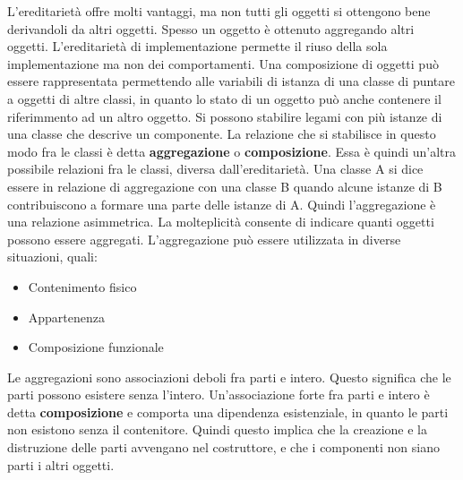 \documentclass[a4paper,18pt]{extarticle}
\begin{document}
L'ereditarietà offre molti vantaggi, ma non tutti gli oggetti si ottengono bene derivandoli da altri oggetti. Spesso un oggetto è ottenuto aggregando altri oggetti. L'ereditarietà di implementazione permette il riuso della sola implementazione ma non dei comportamenti. Una composizione di oggetti può essere rappresentata permettendo alle variabili di istanza di una classe di puntare a oggetti di altre classi, in quanto lo stato di un oggetto può anche contenere il riferimmento ad un altro oggetto. Si possono stabilire legami con più istanze di una classe che descrive un componente. La relazione che si stabilisce in questo modo fra le classi è detta \textbf{aggregazione} o \textbf{composizione}. Essa è quindi un'altra possibile relazioni fra le classi, diversa dall'ereditarietà. Una classe A si dice essere in relazione di aggregazione con una classe B quando alcune istanze di B contribuiscono a formare una parte delle istanze di A. Quindi l'aggregazione è una relazione asimmetrica. La molteplicità consente di indicare quanti oggetti possono essere aggregati. L'aggregazione può essere utilizzata in diverse situazioni, quali:
\begin{itemize}
\item Contenimento fisico
\item Appartenenza
\item Composizione funzionale
\end{itemize}

Le aggregazioni sono associazioni deboli fra parti e intero. Questo significa che le parti possono esistere senza l'intero. Un'associazione forte fra parti e intero è detta \textbf{composizione} e comporta una dipendenza esistenziale, in quanto le parti non esistono senza il contenitore. Quindi questo implica che la creazione e la distruzione delle parti avvengano nel costruttore, e che i componenti non siano parti i altri oggetti.
\end{document}
